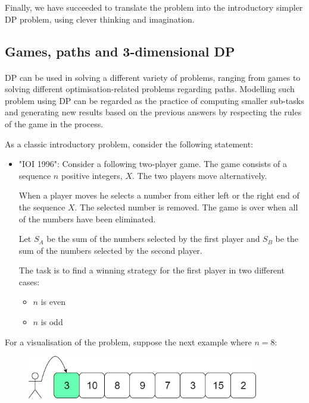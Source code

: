 \documentclass[letterpaper]{article}
\begin{document}
Finally, we have succeeded to translate the problem into the introductory simpler DP problem, using clever thinking and imagination.


\newpage

\subsection{Games, paths and 3-dimensional DP}

\paragraph{}

DP can be used in solving a different variety of problems, ranging from games to solving different optimisation-related problems regarding paths. Modelling such problem using DP can be regarded as the practice of computing smaller sub-tasks and generating new results based on the previous answers by respecting the rules of the game in the process.

As a classic introductory problem, consider the following statement:

\begin{itemize}
    \item "IOI 1996": Consider a following two-player game. The game consists of a sequence $n$ positive integers, $X$. The two players move alternatively.

    When a player moves he selects a number from either left or the right end of the sequence $X$. The selected number is removed. The game is over when all of the numbers have been eliminated.

    Let $S_A$ be the sum of the numbers selected by the first player and $S_B$ be the sum of the numbers selected by the second player.

    The task is to find a winning strategy for the first player in two different cases:
    \begin{itemize}
        \item $n$ is even
        \item $n$ is odd
    \end{itemize}
\end{itemize}

For a visualisation of the problem, suppose the next example where $n = 8$:

\begin{figure} [h!]
\centering
\includegraphics[width=0.90\textwidth]{pngOfDiagrams/gamesandpaths1.png}
\end{figure}
\end{document}
